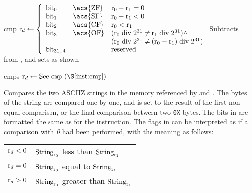\begin{instruction}{cmp}\label{inst:cmp}
  {
    \begin{math}
      \dr \becomes \left\lbrace\begin{array}{lll}
      \textrm{bit}_0 & \textrm{\acs{ZF}} & \sr{0} - \sr{1} = 0 \\
      \textrm{bit}_1 & \textrm{\acs{SF}} & \sr{0} - \sr{1} < 0 \\
      \textrm{bit}_2 & \textrm{\acs{CF}} & \sr{0} < \sr{1} \\
      \textrm{bit}_3 & \textrm{\acs{OF}} &
      (\sr{0} \bdiv 2^{31} \neq \sr{1} \bdiv 2^{31}) \wedge \\
      & & (\sr{0} \bdiv 2^{31} \neq (\sr{0} - \sr{1}) \bdiv 2^{31}) \\
      \textrm{bit}_{31..4} & & \textrm{reserved} \\
      \end{array}
      \right.
    \end{math}
  }
  {
    Subtracts  from , and sets \dr as shown
  }

\end{instruction}


\begin{instruction}{cmps}
     {\rcmpsopc}
     {
       $\dr \becomes \textrm{See \xrefinst{cmp}}$
     }
     {
       Compares the two \acs{ASCIIZ} strings in the memory referenced
       by  and .  The bytes of the string are compared
       one-by-one, and \dr is set to the result of the first non-equal
       comparison, or the final comparison between two \texttt{0X} bytes.
       The bits in \dr are formatted the same as for the 
       instruction.  The flags in \dr can be interpreted as if a comparison
       with \emph{0} had been performed, with the meaning as follows:

       \begin{tabularx}{\linewidth}{ll}
         $\textrm{r}_{d} < 0$ & $\textrm{String}_{\textrm{r}_{0}}$ less than $\textrm{String}_{\textrm{r}_{1}}$ \\
         $\textrm{r}_{d} = 0$ & $\textrm{String}_{\textrm{r}_{0}}$ equal to $\textrm{String}_{\textrm{r}_{1}}$ \\
         $\textrm{r}_{d} > 0$ & $\textrm{String}_{\textrm{r}_{0}}$ greater than $\textrm{String}_{\textrm{r}_{1}}$ \\
       \end{tabularx}
     }
\end{instruction}




